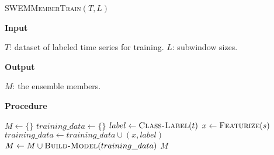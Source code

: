 \documentclass[letterpaper]{article}
\begin{document}
\begin{algorithm}[h]
\caption{\textsc{SWEMMemberTrain}$(T, L)$ }
\label{alg:train}
\textbf{Input}%
\begin{algorithmic}[1]
\STATE $T$: dataset of labeled time series for training.
\STATE $L$: subwindow sizes.
\end{algorithmic}
\textbf{Output}%
\begin{algorithmic}[1]
\STATE $M$: the ensemble members. 
\end{algorithmic}
\textbf{Procedure}%
\begin{algorithmic}[1]
\STATE $ M \leftarrow \{\} $
	\STATE $ training\_data \leftarrow \{\} $
		\STATE $label \leftarrow \textsc{Class-Label}(t)$
			\STATE $x \leftarrow \textsc{Featurize}(s)$
			\STATE $ training\_data \leftarrow training\_data \cup (x,label)$
		\ENDFOR
	\ENDFOR
	\STATE $ M \leftarrow M \cup \textsc{Build-Model}(training\_data) $
\ENDFOR
{} $M$
\end{algorithmic}
\end{algorithm}

\end{document}

